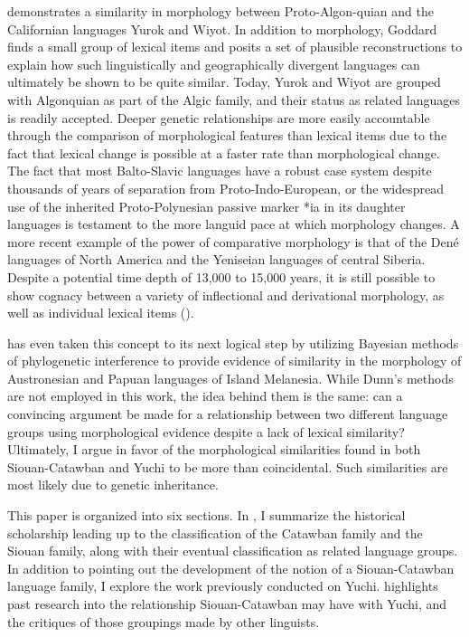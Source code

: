 \documentclass[output=paper]{LSP/langsci}
\begin{document}
\citet{Goddard1975} demonstrates a similarity in morphology between Proto-Algon-quian and the Californian languages Yurok and Wiyot. In addition to morphology, Goddard finds a small group of lexical items and posits a set of plausible reconstructions to explain how such linguistically and geographically divergent languages can ultimately be shown to be quite similar. Today, Yurok and Wiyot are grouped with Algonquian as part of the Algic family, and their status as related languages is readily accepted. Deeper genetic relationships are more easily accountable through the comparison of morphological features than lexical items due to the fact that lexical change is possible at a faster rate than morphological change. The fact that most Balto-Slavic languages have a robust case system despite thousands of years of separation from Proto-Indo-European, or the widespread use of the inherited Proto-Polynesian passive marker *ia in its daughter languages is testament to the more languid pace at which morphology changes. A more recent example of the power of comparative morphology is that of the Den\'e languages of North America and the Yeniseian languages of central Siberia. Despite a potential time depth of 13,000 to 15,000 years, it is still possible to show cognacy between a variety of inflectional and derivational morphology, as well as individual lexical items (\citealt{Vajda2010}).

\citet{Dunn2009} has even taken this concept to its next logical step by utilizing Bayesian methods of phylogenetic interference to provide evidence of similarity in the morphology of Austronesian and Papuan languages of Island Melanesia. While Dunn's methods are not employed in this work, the idea behind them is the same: can a convincing argument be made for a relationship between two different language groups using morphological evidence despite a lack of lexical similarity? Ultimately, I argue in favor of the morphological similarities found in both Siouan-Catawban and Yuchi to be more than coincidental. Such similarities are most likely due to genetic inheritance.

This paper is organized into six sections. In , I summarize the historical scholarship leading up to the classification of the Catawban family and the Siouan family, along with their eventual classification as related language groups. In addition to pointing out the development of the notion of a Siouan-Catawban language family, I explore the work previously conducted on Yuchi.  highlights past research into the relationship Siouan-Catawban may have with Yuchi, and the critiques of those groupings made by other linguists. 
\end{document}
